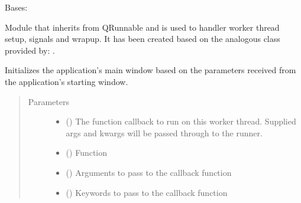 \documentclass[letterpaper,10pt,english]{sphinxmanual}
\begin{document}
\begin{fulllineitems}
\label{\detokenize{gui_worker:src.graphical_user_interface.worker.Worker}}
\sphinxAtStartPar
Bases: 

\sphinxAtStartPar
Module that inherits from QRunnable and is used to handler worker
thread setup, signals and wrap\sphinxhyphen{}up. It has been created based on the analogous
class provided by:
.

\begin{fulllineitems}
\label{\detokenize{gui_worker:src.graphical_user_interface.worker.Worker.__init__}}
\sphinxAtStartPar
Initializes the application’s main window based on the parameters received
from the application’s starting window.
\begin{quote}\begin{description}
\item[{Parameters}] \leavevmode\begin{itemize}
\item {} 
\sphinxAtStartPar
{} () \textendash{} The function callback to run on this worker thread.
Supplied args and kwargs will be passed through to the runner.

\item {} 
\sphinxAtStartPar
{} () \textendash{} Function

\item {} 
\sphinxAtStartPar
{} () \textendash{} Arguments to pass to the callback function

\item {} 
\sphinxAtStartPar
{} () \textendash{} Keywords to pass to the callback function


\end{itemize}
\end{description}
\end{quote}
\end{fulllineitems}
\end{fulllineitems}
\end{document}
